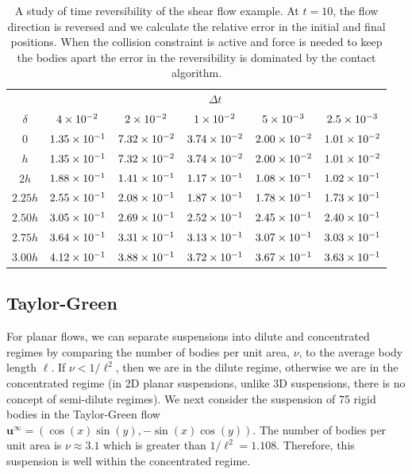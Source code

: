 \documentclass[preprint, 10pt]{elsarticle}
\begin{document}
\begin{table}[!h]
\begin{center}
\begin{tabular}{c| c c c c c}
$ $ & & & $\Delta t$ & &\\
$\delta$ & $4\times 10^{-2}$ &$ 2\times 10^{-2}$ & $1\times 10^{-2}$ & $5\times 10^{-3}$ & $2.5\times 10^{-3}$\\
\hline
0 & $1.35\times 10^{-1}$ & $7.32\times 10^{-2}$ & $3.74\times 10^{-2}$ & $2.00\times 10^{-2}$ & $1.01\times 10^{-2}$\\
$h$ & $1.35\times 10^{-1}$ & $7.32\times 10^{-2}$ & $3.74\times 10^{-2}$ & $2.00\times 10^{-2}$ & $1.01\times 10^{-2}$\\
$2h$ & $1.88\times 10^{-1}$ & $1.41\times 10^{-1}$ & $1.17\times 10^{-1}$ & $1.08\times 10^{-1}$ &
$1.02\times 10^{-1}$\\
$2.25h$ & $2.55\times 10^{-1}$ & $2.08\times 10^{-1}$ & $1.87\times 10^{-1}$ & $1.78\times 10^{-1}$ &
$1.73\times 10^{-1}$\\
$2.50h$ & $3.05\times 10^{-1}$ & $2.69\times 10^{-1}$ & $2.52\times 10^{-1}$ & $2.45\times 10^{-1}$ &
$2.40\times 10^{-1}$\\
$2.75h$ & $3.64\times 10^{-1}$ & $3.31\times 10^{-1}$ & $3.13\times 10^{-1}$ & $3.07\times 10^{-1}$ &
$3.03\times 10^{-1}$\\
$3.00h$ & $4.12\times 10^{-1}$ & $3.88\times 10^{-1}$ & $3.72\times 10^{-1}$ & $3.67\times 10^{-1}$ &
$3.63\times 10^{-1}$
\end{tabular}
\end{center}
\caption{A study of time reversibility of the shear flow example. At
$t=10$, the flow direction is reversed and we calculate the relative
error in the initial and final positions. When the collision constraint
is active and force is needed to keep the bodies apart the error in
the reversibility is dominated by the contact
algorithm.}\label{tab:reverse}
\end{table}

\subsection{Taylor-Green}

For planar flows, we can separate suspensions into dilute and
concentrated regimes by comparing the number of bodies per unit area,
$\nu$, to the average body length $\ell$. If $\nu < 1/\ell^2$, then
we are in the dilute regime, otherwise we are in the concentrated regime
(in 2D planar suspensions, unlike 3D suspensions, there is no concept of
semi-dilute regimes).  We next consider the suspension of 75 rigid
bodies in the Taylor-Green flow $\mathbf{u}^\infty = (\cos(x)\sin(y),
-\sin(x)\cos(y))$.  The number of bodies per unit area is $\nu
\approx 3.1$ which is greater than $1/\ell^2=1.108$.  Therefore, this
suspension is well within the concentrated regime. 
\end{document}
